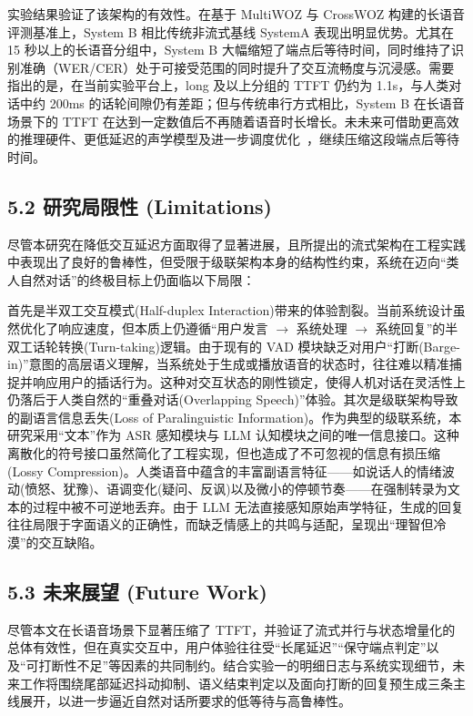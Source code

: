 \documentclass[UTF8,a4paper,12pt]{ctexart}
\begin{document}
实验结果验证了该架构的有效性。在基于 MultiWOZ 与 CrossWOZ 构建的长语音评测基准上，System B 相比传统非流式基线 SystemA 表现出明显优势。尤其在 15 秒以上的长语音分组中，System B 大幅缩短了端点后等待时间，同时维持了识别准确（WER/CER）处于可接受范围的同时提升了交互流畅度与沉浸感。需要指出的是，在当前实验平台上，long 及以上分组的 TTFT 仍约为 1.1s，与人类对话中约 200ms 的话轮间隙仍有差距；但与传统串行方式相比，System B 在长语音场景下的 TTFT 在达到一定数值后不再随着语音时长增长。未未来可借助更高效的推理硬件、更低延迟的声学模型及进一步调度优化 ，继续压缩这段端点后等待时间。

\subsection*{5.2 研究局限性 (Limitations)}


尽管本研究在降低交互延迟方面取得了显著进展，且所提出的流式架构在工程实践中表现出了良好的鲁棒性，但受限于级联架构本身的结构性约束，系统在迈向“类人自然对话”的终极目标上仍面临以下局限：  

首先是半双工交互模式(Half-duplex Interaction)带来的体验割裂。当前系统设计虽然优化了响应速度，但本质上仍遵循“用户发言 $\rightarrow$ 系统处理 $\rightarrow$ 系统回复”的半双工话轮转换(Turn-taking)逻辑。由于现有的 VAD 模块缺乏对用户“打断(Barge-in)”意图的高层语义理解，当系统处于生成或播放语音的状态时，往往难以精准捕捉并响应用户的插话行为。这种对交互状态的刚性锁定，使得人机对话在灵活性上仍落后于人类自然的“重叠对话(Overlapping Speech)”体验。其次是级联架构导致的副语言信息丢失(Loss of Paralinguistic Information)。作为典型的级联系统，本研究采用“文本”作为 ASR 感知模块与 LLM 认知模块之间的唯一信息接口。这种离散化的符号接口虽然简化了工程实现，但也造成了不可忽视的信息有损压缩(Lossy Compression)。人类语音中蕴含的丰富副语言特征——如说话人的情绪波动(愤怒、犹豫)、语调变化(疑问、反讽)以及微小的停顿节奏——在强制转录为文本的过程中被不可逆地丢弃。由于 LLM 无法直接感知原始声学特征，生成的回复往往局限于字面语义的正确性，而缺乏情感上的共鸣与适配，呈现出“理智但冷漠”的交互缺陷。  

\subsection*{5.3 未来展望 (Future Work)}


尽管本文在长语音场景下显著压缩了 TTFT，并验证了流式并行与状态增量化的总体有效性，但在真实交互中，用户体验往往受“长尾延迟”“保守端点判定”以及“可打断性不足”等因素的共同制约。结合实验一的明细日志与系统实现细节，未来工作将围绕尾部延迟抖动抑制、语义结束判定以及面向打断的回复预生成三条主线展开，以进一步逼近自然对话所要求的低等待与高鲁棒性。
\end{document}
